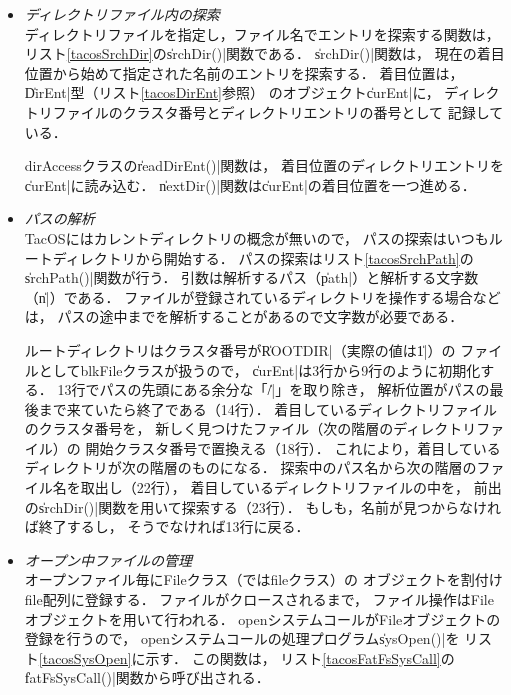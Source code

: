 \begin{itemize}
\item \emph{ディレクトリファイル内の探索} \\
  ディレクトリファイルを指定し，ファイル名でエントリを探索する関数は，
  リスト\ref{tacosSrchDir}の\|srchDir()|関数である．
  \|srchDir()|関数は，
  現在の着目位置から始めて指定された名前のエントリを探索する．
  着目位置は，\|DirEnt|型（リスト\ref{tacosDirEnt}参照）
  のオブジェクト\|curEnt|に，
  ディレクトリファイルのクラスタ番号とディレクトリエントリの番号として
  記録している．

  

  dirAccessクラスの\|readDirEnt()|関数は，
  着目位置のディレクトリエントリを\|curEnt|に読み込む．
  \|nextDir()|関数は\|curEnt|の着目位置を一つ進める．

\item \emph{パスの解析} \\
  TacOSにはカレントディレクトリの概念が無いので，
  パスの探索はいつもルートディレクトリから開始する．
  パスの探索はリスト\ref{tacosSrchPath}の\|srchPath()|関数が行う．
  引数は解析するパス（\|path|）と解析する文字数（\|n|）である．
  ファイルが登録されているディレクトリを操作する場合などは，
  パスの途中までを解析することがあるので文字数が必要である．
  
  

  ルートディレクトリはクラスタ番号が\|ROOTDIR|（実際の値は\|1|）の
  ファイルとしてblkFileクラスが扱うので，
  \|curEnt|は3行から9行のように初期化する．
  13行でパスの先頭にある余分な「\|/|」を取り除き，
  解析位置がパスの最後まで来ていたら終了である（14行）．
  着目しているディレクトリファイルのクラスタ番号を，
  新しく見つけたファイル（次の階層のディレクトリファイル）の
  開始クラスタ番号で置換える（18行）．
  これにより，着目しているディレクトリが次の階層のものになる．
  探索中のパス名から次の階層のファイル名を取出し（22行），
  着目しているディレクトリファイルの中を，
  前出の\|srchDir()|関数を用いて探索する（23行）．
  もしも，名前が見つからなければ終了するし，
  そうでなければ13行に戻る．

\item \emph{オープン中ファイルの管理} \\
  オープンファイル毎にFileクラス（ではfileクラス）の
  オブジェクトを割付けfile配列に登録する．
  ファイルがクロースされるまで，
  ファイル操作はFileオブジェクトを用いて行われる．
  openシステムコールがFileオブジェクトの登録を行うので，
  openシステムコールの処理プログラム\|sysOpen()|を
  リスト\ref{tacosSysOpen}に示す．
  この関数は，
  リスト\ref{tacosFatFsSysCall}の\|fatFsSysCall()|関数から呼び出される．


\end{itemize}
